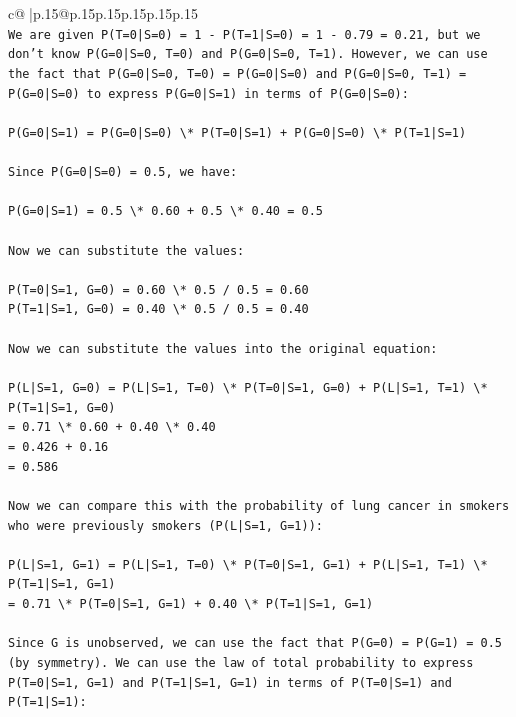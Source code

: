 \documentclass{article}
\begin{document}
{\begin{supertabular}{c@{$\;$}|p{.15\linewidth}@{}p{.15\linewidth}p{.15\linewidth}p{.15\linewidth}p{.15\linewidth}p{.15\linewidth}}
{{{\\ 
\texttt{We are given P(T=0|S=0) = 1 {-} P(T=1|S=0) = 1 {-} 0.79 = 0.21, but we don't know P(G=0|S=0, T=0) and P(G=0|S=0, T=1). However, we can use the fact that P(G=0|S=0, T=0) = P(G=0|S=0) and P(G=0|S=0, T=1) = P(G=0|S=0) to express P(G=0|S=1) in terms of P(G=0|S=0):} \\
\\ 
\texttt{P(G=0|S=1) = P(G=0|S=0) \textbackslash{}* P(T=0|S=1) + P(G=0|S=0) \textbackslash{}* P(T=1|S=1)} \\
\\ 
\texttt{Since P(G=0|S=0) = 0.5, we have:} \\
\\ 
\texttt{P(G=0|S=1) = 0.5 \textbackslash{}* 0.60 + 0.5 \textbackslash{}* 0.40 = 0.5} \\
\\ 
\texttt{Now we can substitute the values:} \\
\\ 
\texttt{P(T=0|S=1, G=0) = 0.60 \textbackslash{}* 0.5 / 0.5 = 0.60} \\
\texttt{P(T=1|S=1, G=0) = 0.40 \textbackslash{}* 0.5 / 0.5 = 0.40} \\
\\ 
\texttt{Now we can substitute the values into the original equation:} \\
\\ 
\texttt{P(L|S=1, G=0) = P(L|S=1, T=0) \textbackslash{}* P(T=0|S=1, G=0) + P(L|S=1, T=1) \textbackslash{}* P(T=1|S=1, G=0)} \\
\texttt{= 0.71 \textbackslash{}* 0.60 + 0.40 \textbackslash{}* 0.40} \\
\texttt{= 0.426 + 0.16} \\
\texttt{= 0.586} \\
\\ 
\texttt{Now we can compare this with the probability of lung cancer in smokers who were previously smokers (P(L|S=1, G=1)):} \\
\\ 
\texttt{P(L|S=1, G=1) = P(L|S=1, T=0) \textbackslash{}* P(T=0|S=1, G=1) + P(L|S=1, T=1) \textbackslash{}* P(T=1|S=1, G=1)} \\
\texttt{= 0.71 \textbackslash{}* P(T=0|S=1, G=1) + 0.40 \textbackslash{}* P(T=1|S=1, G=1)} \\
\\ 
\texttt{Since G is unobserved, we can use the fact that P(G=0) = P(G=1) = 0.5 (by symmetry). We can use the law of total probability to express P(T=0|S=1, G=1) and P(T=1|S=1, G=1) in terms of P(T=0|S=1) and P(T=1|S=1):} \\
}}}
\end{supertabular}}
\end{document}
